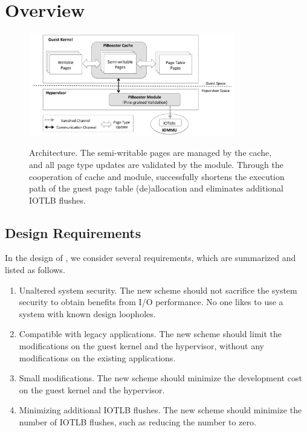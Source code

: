 \section{\name Overview} \label{sec:overview}
\begin{figure}[ht]
\centering
\includegraphics[width=0.8\textwidth]{image/overview/arch.pdf} \\
\caption{\name Architecture. The semi-writable pages are managed by the \name cache, and all page type updates are validated by the \name module.
Through the cooperation of \name cache and \name module, \name successfully shortens the execution path of the guest page table (de)allocation and eliminates additional IOTLB flushes.}
\label{fig:arch}
\end{figure}

\subsection{Design Requirements}\label{sec:req}
In the design of \name, we consider several requirements, which are summarized and listed as follows.
\begin{enumerate}
\item Unaltered system security. The new scheme should not sacrifice the system security to obtain benefits from I/O performance. No one likes to use a system with known design loopholes.
\item Compatible with legacy applications. The new scheme should limit the modifications on the guest kernel and the hypervisor, without any modifications on the existing applications.
\item Small modifications. The new scheme should minimize the development cost on the guest kernel and the hypervisor.
\item Minimizing additional IOTLB flushes. The new scheme should minimize the number of IOTLB flushes, such as reducing the number to zero.
\end{enumerate}

